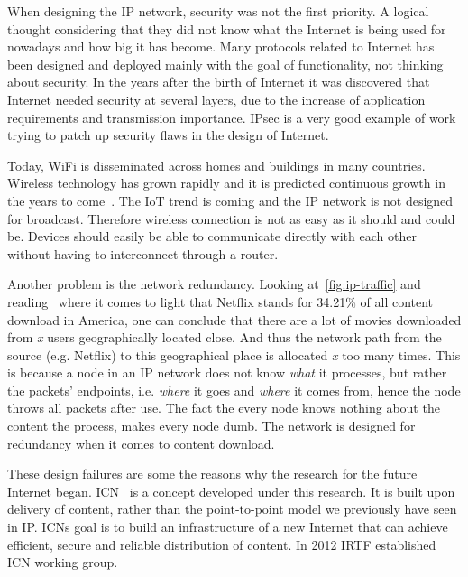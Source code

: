 When designing the \gls{IP} network, security was not the first priority.
A logical thought considering that they did not know what the Internet is being used for nowadays and how big it has become.
Many protocols related to Internet has been designed and deployed mainly with the goal of functionality, not thinking about security.
In the years after the birth of Internet it was discovered that Internet needed security at several layers, due to the increase of application requirements and transmission importance.
\gls{IPsec} is a very good example of work trying to patch up security flaws in the design of Internet.

Today, WiFi is disseminated across homes and buildings in many countries. 
Wireless technology has grown rapidly and it is predicted continuous growth in the years to come~\cite{DBLP:journals/jthtl/Rosston14}. 
The \gls{IoT} trend is coming and the \gls{IP} network is not designed for broadcast.
Therefore wireless connection is not as easy as it should and could be.
Devices should easily be able to communicate directly with each other without having to interconnect through a router.

Another problem is the network redundancy. 
Looking at~\autoref{fig:ip-traffic} and reading~\cite{gipr2014} where it comes to light that Netflix stands for 34.21\% of all content download in America, one can conclude that there are a lot of movies downloaded from \textit{x} users geographically located close.
And thus the network path from the source (e.g. Netflix) to this geographical place is allocated \textit{x} too many times. 
This is because a node in an \gls{IP} network does not know \textit{what} it processes, but rather the packets' endpoints, i.e. \textit{where} it goes and \textit{where} it comes from, hence the node throws all packets after use. 
The fact the every node knows nothing about the content the process, makes every node dumb.
The network is designed for redundancy when it comes to content download.

These design failures are some the reasons why the research for the future Internet began.  
\gls{ICN}~\cite{DBLP:journals/cm/AhlgrenDIKO12} is a concept developed under this research.
It is built upon delivery of content, rather than the point-to-point model we previously have seen in \gls{IP}.
\gls{ICN}s goal is to build an infrastructure of a new Internet that can achieve efficient, secure and reliable distribution of content.
In 2012 \gls{IRTF} established \gls{ICN} working group.


